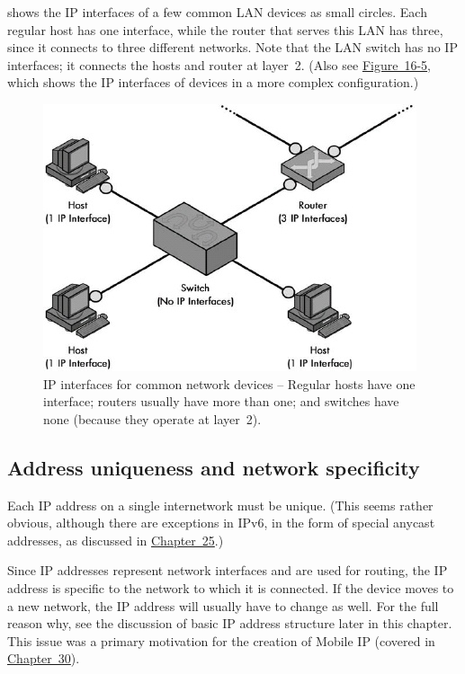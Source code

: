\documentclass[b5paper,11pt]{memoir}
\begin{document}
 shows the IP interfaces of a few common LAN devices as small circles.
Each regular host has one interface, while the router that serves this LAN has three, since it connects to three different networks.
Note that the LAN switch has no IP interfaces; it connects the hosts and router at layer~2.
(Also see \protect\hyperlink{ch16s06.htmlux5cux23multihomed_devices_on_an_ip_internetwork}{Figure~16-5}, which shows the IP interfaces of devices in a more complex configuration.)


\begin{figure}
   \centering
   \includegraphics[width=.6\textwidth]{images/ip-interfaces.jpg}
   \caption{IP interfaces for common network devices -- Regular hosts have one interface; routers usually have more than one; and switches have none (because they operate at layer~2).}
   \label{fig:ip-interfaces}
\end{figure}



\subsection{Address uniqueness and network specificity}

Each IP address on a single internetwork must be unique.
(This seems rather obvious, although there are exceptions in IPv6, in the form of special anycast addresses, as discussed in \protect\hyperlink{ch25.html}{Chapter~25}.)

Since IP addresses represent network interfaces and are used for routing, the IP address is
specific to the network to which it is connected. If the device moves to
a new network, the IP address will usually have to change as well. For
the full reason why, see the discussion of basic IP address structure
later in this chapter. This issue was a primary motivation for the
creation of Mobile IP (covered in
\protect\hyperlink{ch30.html}{Chapter~30}).
\end{document}
